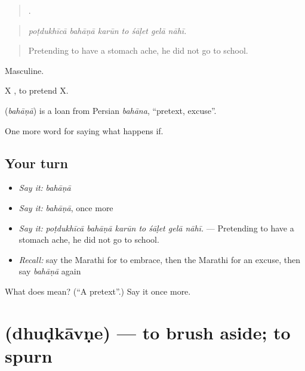 \begin{quote}
      .
\end{quote}

\begin{quote}
\emph{poṭdukhīcā bahāṇā karūn to śāḷet gelā nāhī.}
\end{quote}

\begin{quote}
Pretending to have a stomach ache, he did not go to school.
\end{quote}

Masculine.

X   , to pretend X.

\begin{cousinweb}
\textbf{} (\emph{bahāṇā}) is a loan from Persian \emph{bahāna}, \textquotedblleft{}pretext, excuse\textquotedblright{}.
\end{cousinweb}

\begin{grammarlens}[title={What you've built}]
One more word for saying what happens if.
\end{grammarlens}

\subsection*{Your turn}
\begin{itemize}
\raggedright
  \item \emph{Say it:} \emph{bahāṇā}
  \item \emph{Say it:} \emph{bahāṇā}, once more
  \item \emph{Say it:} \emph{poṭdukhīcā bahāṇā karūn to śāḷet gelā nāhī.} — Pretending to have a stomach ache, he did not go to school.
  \item \emph{Recall:} say the Marathi for to embrace, then the Marathi for an excuse, then say \emph{bahāṇā} again
\end{itemize}

\begin{tcolorbox}[breakable,colback=teal!4,colframe=teal!35!black,title={Before you move on}]
What does  mean? (\textquotedblleft{}A pretext\textquotedblright{}.) Say it once more.
\end{tcolorbox}
\section[\texorpdfstring{\mr{धुडकावणे} (dhuḍkāvṇe)}{धुडकावणे (dhuḍkāvṇe)}]{ (dhuḍkāvṇe) — to brush aside; to spurn}

